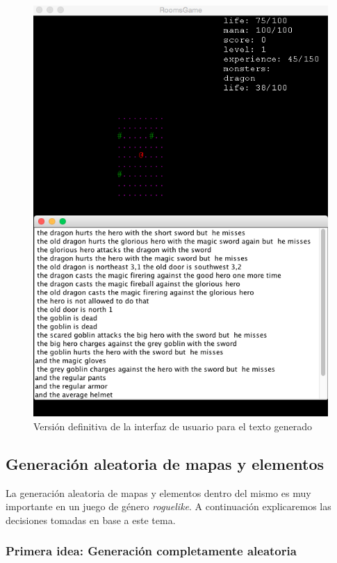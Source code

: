 \begin{figure}
    \includegraphics[width=\textwidth,height=\textheight,keepaspectratio]{./img/lastiterationui.png}
  \caption{Versión definitiva de la interfaz de usuario para el texto generado}
  \label{fig:lastiterationui}
\end{figure}

\subsection{Generación aleatoria de mapas y elementos}

La generación aleatoria de mapas y elementos dentro del mismo es muy importante en un juego de género \textit{roguelike}. A continuación explicaremos las decisiones tomadas en base a este tema.

\subsubsection{Primera idea: Generación completamente aleatoria}

